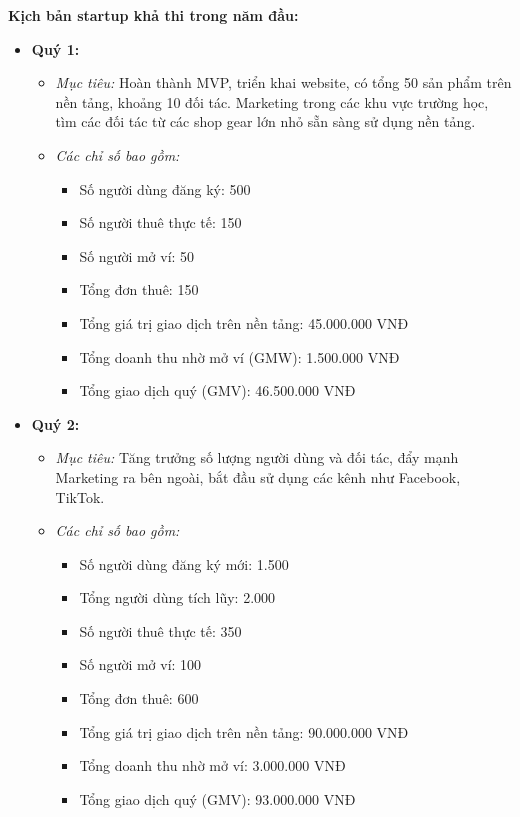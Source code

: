 \textbf{Kịch bản startup khả thi trong năm đầu:}
\begin{itemize}
    \item \textbf{Quý 1:}
    \begin{itemize}
        \item \textit{Mục tiêu:} Hoàn thành MVP, triển khai website, có tổng 50 sản phẩm trên nền tảng, khoảng 10 đối tác. Marketing trong các khu vực trường học, tìm các đối tác từ các shop gear lớn nhỏ sẵn sàng sử dụng nền tảng.
        \item \textit{Các chỉ số bao gồm:}
        \begin{itemize}
            \item Số người dùng đăng ký: 500
            \item Số người thuê thực tế: 150
            \item Số người mở ví: 50
            \item Tổng đơn thuê: 150
            \item Tổng giá trị giao dịch trên nền tảng: 45.000.000 VNĐ
            \item Tổng doanh thu nhờ mở ví (GMW): 1.500.000 VNĐ
            \item Tổng giao dịch quý (GMV): 46.500.000 VNĐ
        \end{itemize}
    \end{itemize}
    \item \textbf{Quý 2:}
    \begin{itemize}
        \item \textit{Mục tiêu:} Tăng trưởng số lượng người dùng và đối tác, đẩy mạnh Marketing ra bên ngoài, bắt đầu sử dụng các kênh như Facebook, TikTok.
        \item \textit{Các chỉ số bao gồm:}
        \begin{itemize}
            \item Số người dùng đăng ký mới: 1.500
            \item Tổng người dùng tích lũy: 2.000
            \item Số người thuê thực tế: 350
            \item Số người mở ví: 100
            \item Tổng đơn thuê: 600
            \item Tổng giá trị giao dịch trên nền tảng: 90.000.000 VNĐ
            \item Tổng doanh thu nhờ mở ví: 3.000.000 VNĐ
            \item Tổng giao dịch quý (GMV): 93.000.000 VNĐ

\end{itemize}
\end{itemize}
\end{itemize}
